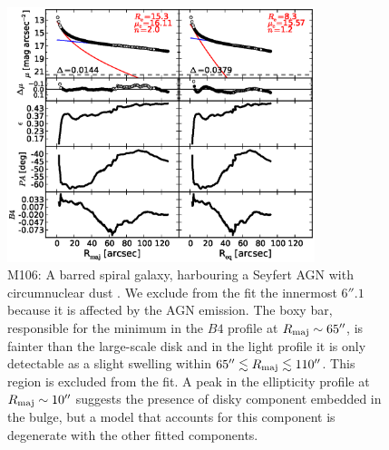 \documentclass[preprint2]{emulateapj}
\newcommand{\fitfigurewidth}{0.8\textwidth}
\begin{document}
  \begin{figure}[h]
  \begin{center}
  \includegraphics[width=\fitfigurewidth]{images/m106_1Dfit.eps}
  \caption{M106: 
  A barred spiral galaxy, harbouring a Seyfert AGN \citep{veroncettyveron2006} 
  with circumnuclear dust \citep{martini2003}. 
  We exclude from the fit the innermost $6''.1$ because it is affected by the AGN emission.
  The boxy bar, responsible for the minimum in the $B4$ profile at $R_{\rm maj} \sim 65''$, 
  is fainter than the large-scale disk and in the light profile it is only detectable as a slight swelling
  within $65'' \lesssim R_{\rm maj} \lesssim 110''$.
  This region is excluded from the fit.
  A peak in the ellipticity profile at $R_{\rm maj} \sim 10''$ suggests the presence of disky component embedded in the bulge, 
  but a model that accounts for this component is degenerate with the other fitted components.
  }
  \end{center}
  \end{figure}
\end{document}
